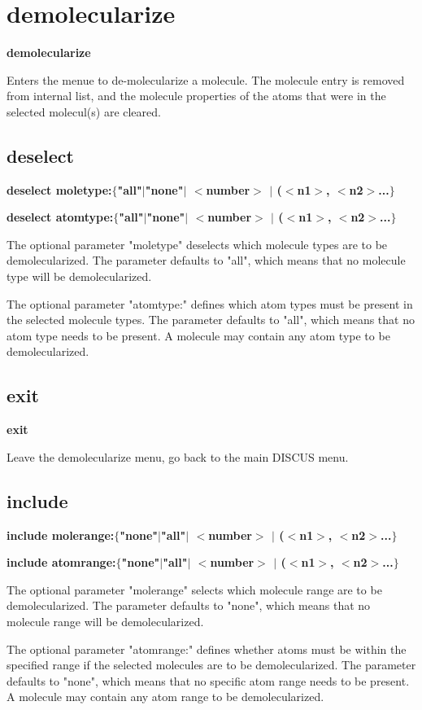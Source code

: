 \section{demolecularize}
{\bf demolecularize \par }
\par
\vspace{3pt}
Enters the menue to de-molecularize a molecule. 
The molecule entry is removed from internal list, and the 
molecule properties of the atoms that were in the selected 
molecul(s) are cleared. 
\par
\subsection*{deselect}
{\bf deselect moletype:$ \{$"all"$| $"none"$| $ $ <$number$> $ $| $ ($ <$n1$> $, $ <$n2$> $...$\} $ \par }
{\bf deselect atomtype:$ \{$"all"$| $"none"$| $ $ <$number$> $ $| $ ($ <$n1$> $, $ <$n2$> $...$\} $ \par }
\par
\vspace{3pt}
The optional parameter "moletype" deselects which molecule 
types are to be demolecularized. 
The parameter defaults to "all", which means that no 
molecule type will be demolecularized. 
\par
The optional parameter "atomtype:" defines which atom 
types must be present in the selected molecule types. 
The parameter defaults to "all", which means that no 
atom type needs to be present. A molecule may contain 
any atom type to be demolecularized. 
\subsection*{exit}
{\bf exit \par }
\par
\vspace{3pt}
Leave the demolecularize menu, go back to the main 
DISCUS menu. 
\subsection*{include}
{\bf include molerange:$ \{$"none"$| $"all"$| $ $ <$number$> $ $| $ ($ <$n1$> $, $ <$n2$> $...$\} $ \par }
{\bf include atomrange:$ \{$"none"$| $"all"$| $ $ <$number$> $ $| $ ($ <$n1$> $, $ <$n2$> $...$\} $ \par }
\par
\vspace{3pt}
The optional parameter "molerange" selects which molecule 
range are to be demolecularized. 
The parameter defaults to "none", which means that no 
molecule range will be demolecularized. 
\par
The optional parameter "atomrange:" defines whether atoms 
must be within the specified range if the selected 
molecules are to be demolecularized. 
The parameter defaults to "none", which means that no 
specific atom range needs to be present. A molecule may 
contain any atom range to be demolecularized. 
